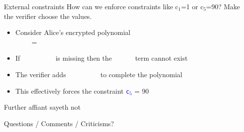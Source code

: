 \documentclass[dvipsnames]{beamer}
\newcommand{\pub}[1]{\textcolor{blue}{\texttt{#1}}}
\newcommand{\enc}[1]{\colorbox{SkyBlue!75}{\textcolor{white}{\texttt{#1}}}}
\begin{document}
    \begin{frame}{External constraints}
        How can we enforce constraints like c$_1$=1 or c$_5$=90?
        Make the verifier choose the values.

        \begin{itemize}
            \item Consider Alice's encrypted polynomial\\
            \enc{L(s)} = \enc{(c$_1$u$_1$L$_1$+c$_2$u$_2$L$_2$+c$_3$u$_3$L$_3$+c$_4$u$_4$L$_4$+c$_5$u$_5$L$_5$)(s)}
            \item If \enc{$\beta\cdot$u$_5$L$_5$(s)} is missing then the \enc{c$_5$u$_5$L$_5$} term cannot exist
            \item The verifier adds \enc{90u$_5$L$_5$(s)} to complete the polynomial
            \item This effectively forces the constraint \pub{c$_5$} = 90
        \end{itemize}
    \end{frame}

    \begin{frame}{Further affiant sayeth not}

    {\huge Questions / Comments / Criticisms?}
    \end{frame}
\end{document}
